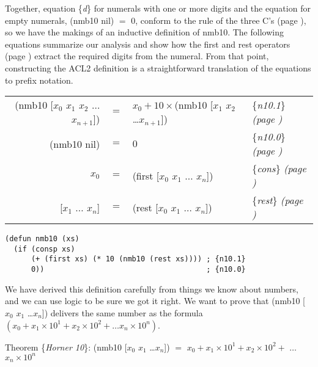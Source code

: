 Together, equation \{\emph{d}\} for numerals with one or more digits
and the equation for empty numerals, \textsf{(nmb10 nil)} $=$ $0$, conform to the
rule of the three C's (page \pageref{fig:inductive-def-keys}),
so we have the makings of an inductive definition of \textsf{nmb10}.
The following equations summarize our analysis and show how
the \textsf{first} and \textsf{rest} operators
(page \pageref{first-rest-cons})
extract the required digits from the numeral.
From that point, constructing the ACL2 definition
is a straightforward translation of the equations to prefix notation.
\begin{center}
\addtolength{\tabcolsep}{-3pt}
\begin{tabular}{rlll}
\textsf{(nmb10 [$x_0$ $x_1$ $x_2$ $\dots$ $x_{n+1}$])} & $=$ &$x_0 + 10\times$\textsf{(nmb10 [$x_1$ $x_2$ \dots $x_{n+1}$])} &\{\emph{n10.1}\} \emph{(page \pageref{nmb10-defun})}\\
\textsf{(nmb10 nil)}                           & $=$ &$0$   &\{\emph{n10.0}\} \emph{(page \pageref{nmb10-defun})}\\
$x_0$                         & $=$ &\textsf{(first [$x_0$ $x_1$ $\dots$ $x_n$])} &\{\emph{cons}\} \emph{(page \pageref{first-rest-cons})}\\
\textsf{{[$x_1$ $\dots$ $x_n$]}}       & $=$ &\textsf{(rest  [$x_0$ $x_1$ $\dots$ $x_n$])} &\{\emph{rest}\} \emph{(page \pageref{first-rest-cons})}\\ %
\end{tabular}
\addtolength{\tabcolsep}{3pt}
\end{center}\label{nmb10-defun}

\begin{code}
\begin{verbatim}
(defun nmb10 (xs)
  (if (consp xs)
      (+ (first xs) (* 10 (nmb10 (rest xs)))) ; {n10.1}
      0))                                     ; {n10.0}
\end{verbatim}
\end{code}

We have derived this definition carefully
from things we know about numbers,
and we can use logic to be sure we got it right.
We want to prove that
\textsf{(nmb10 [$x_0$ $x_1$ \dots $x_{n}$])}
delivers the same number as the formula
$(x_0 + x_1 \times 10^1 + x_2 \times 10^2 + \dots x_{n} \times 10^{n})$.
\begin{center}
\label{horner10-thm}Theorem
\{\emph{Horner 10}\}:
\textsf{(nmb10 [$x_0$ $x_1$ \dots $x_{n}$])} $=$
$x_0 + x_1 \times 10^1 + x_2 \times 10^2 +$ $\dots$ $x_{n} \times 10^{n}$
\end{center}


